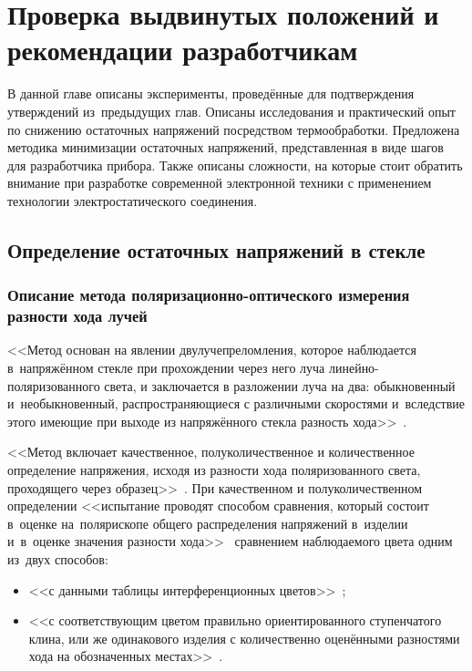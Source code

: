 \chapter{Проверка выдвинутых положений и рекомендации разработчикам}

В данной главе описаны эксперименты,
проведённые для подтверждения утверждений из~предыдущих глав. Описаны
исследования и практический опыт по снижению остаточных напряжений
посредством термообработки. Предложена методика минимизации остаточных
напряжений, представленная в виде шагов для разработчика прибора.
Также описаны сложности, на которые стоит обратить внимание при
разработке современной электронной техники с применением технологии
электростатического соединения.

\section{Определение остаточных напряжений в стекле}
\subsection{Описание метода поляризационно-оптического измерения разности хода лучей}\label{chap:measure_glass_stress}
<<Метод основан на явлении двулучепреломления, которое наблюдается в~напряжённом стекле при прохождении через него луча линейно-поляризованного света, и заключается в разложении луча на два: обыкновенный и~необыкновенный, распространяющиеся с различными скоростями и~вследствие этого имеющие при выходе из напряжённого
стекла разность хода>>~\cite{gost_metod_opred_dvulucheprelom}.

<<Метод включает качественное, полуколичественное и количественное определение
напряжения, исходя из разности хода поляризованного света, проходящего через
образец>>~\cite{gost_metod_opred_dvulucheprelom}.
При качественном и полуколичественном определении <<испытание проводят
способом сравнения, который состоит в~оценке на~полярископе общего
распределения напряжений в~изделии и~в~оценке значения разности
хода>>~\cite{gost_metod_opred_dvulucheprelom} сравнением наблюдаемого цвета одним из~двух способов:
\begin{itemize}
    \item <<с данными
    таблицы интерференционных цветов>>~\cite{gost_metod_opred_dvulucheprelom};
    \item <<с соответствующим цветом
    правильно ориентированного ступенчатого клина, или же одинакового
    изделия с количественно оценёнными разностями хода на обозначенных
    местах>>~\cite{gost_metod_opred_dvulucheprelom}.
\end{itemize}

